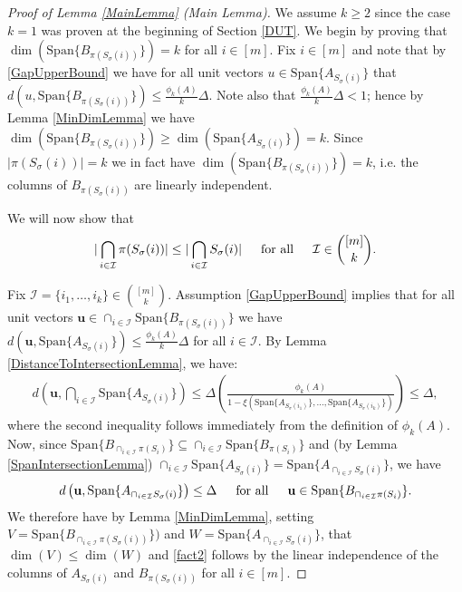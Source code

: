 \documentclass[journal, onecolumn]{IEEEtran}
\begin{document}

\begin{proof}[Proof of Lemma \ref{MainLemma} (Main Lemma)]
We assume $k \geq 2$ since the case $k = 1$ was proven at the beginning of Section \ref{DUT}. We begin by proving that $\dim(\text{Span}\{B_{\pi(S_\sigma(i))}\}) = k$ for all $i \in [m]$. Fix $i \in [m]$ and note that by \eqref{GapUpperBound} we have for all unit vectors $u \in \text{Span}\{A_{S_\sigma(i)}\}$ that $d(u, \text{Span}\{B_{\pi(S_\sigma(i))}\}) \leq \frac{\phi_k(A)}{k} \Delta$. Note also that $\frac{\phi_k(A)}{k} \Delta < 1$; hence by Lemma \ref{MinDimLemma} we have $\dim(\text{Span}\{B_{\pi(S_\sigma(i))}\}) \geq \dim(\text{Span}\{A_{S_\sigma(i)}\}) = k$. Since $|\pi(S_\sigma(i))| = k$ we in fact have $\dim(\text{Span}\{B_{\pi(S_\sigma(i))}\}) = k$, i.e. the columns of $B_{\pi(S_\sigma(i))}$ are linearly independent. 

We will now show that
\begin{align}\label{fact2}
|\bigcap_{i \in \mathcal{I}} \pi(S_\sigma(i))| \leq |\bigcap_{i \in \mathcal{I}} S_\sigma(i) | \indent \text{for all} \indent \mathcal{I} \in {[m] \choose k}.
\end{align}

Fix $\mathcal{I} = \{i_1, \ldots, i_k\} \in {[m] \choose k}$. Assumption \eqref{GapUpperBound} implies that for all unit vectors $\mathbf{u} \in \cap_{i \in \mathcal{I}} \text{Span}\{B_{\pi(S_\sigma(i))}\}$ we have $d(\mathbf{u}, \text{Span}\{A_{S_\sigma(i)}\}) \leq \frac{\phi_k(A)}{k} \Delta$ for all $i \in \mathcal{I}$. By Lemma \ref{DistanceToIntersectionLemma}, we have:
\begin{align*}
d\left( \mathbf{u}, \bigcap_{i \in \mathcal{I}} \text{Span}\{A_{S_{\sigma}(i)}\} \right) 
\leq \Delta \left( \frac{\phi_k(A)}{1 - \xi(\text{Span}\{A_{S_{\sigma}(i_1)}\}, \ldots, \text{Span}\{A_{S_\sigma(i_k)}\})} \right) \leq \Delta,
\end{align*}
%
where the second inequality follows immediately from the definition of $\phi_k(A)$. Now, since $\text{Span}\{B_{\cap_{i \in \mathcal{I}}\pi(S_i)}\} \subseteq \cap_{i \in \mathcal{I}} \text{Span}\{B_{\pi(S_i)}\}$ and (by Lemma \ref{SpanIntersectionLemma}) $\cap_{i \in \mathcal{I}}  \text{Span}\{A_{S_\sigma(i)}\} = \text{Span}\{A_{\cap_{i \in \mathcal{I}}  S_\sigma(i)}\}$, we have
\begin{align}\label{fact1}
d\left( \mathbf{u}, \text{Span}\{A_{\cap_{i \in \mathcal{I}} S_\sigma(i)}\} \right) \leq \Delta \indent \text{for all} \indent \mathbf{u} \in \text{Span}\{B_{\cap_{i \in \mathcal{I}}\pi(S_i)}\}.
\end{align}
We therefore have by Lemma \ref{MinDimLemma}, setting $V = \text{Span}\{B_{\cap_{i \in \mathcal{I}}\pi(S_\sigma(i))}\})$ and $W = \text{Span}\{A_{\cap_{i \in \mathcal{I}} S_\sigma(i)}\}$, that $\dim(V) \leq \dim(W)$ and \eqref{fact2} follows by the linear independence of the columns of $A_{S_\sigma(i)}$ and $B_{\pi(S_\sigma(i))}$ for all $i \in [m]$.


\end{proof}
\end{document}
